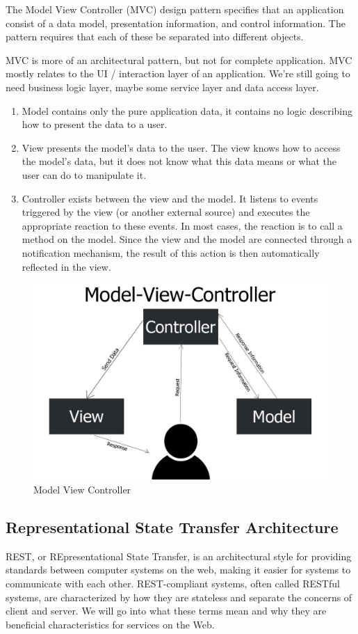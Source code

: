 The Model View Controller (MVC) design pattern specifies that an application consist of a data model, presentation information, and control information. The pattern requires that each of these be separated into different objects.

MVC is more of an architectural pattern, but not for complete application. MVC mostly relates to the UI / interaction layer of an application. We’re still going to need business logic layer, maybe some service layer and data access layer.
\begin{enumerate}
      \item Model contains only the pure application data, it contains no logic describing how to present the data to a user.
      \item View presents the model’s data to the user. The view knows how to access the model’s data, but it does not know what this data means or what the user can do to manipulate it.
      \item Controller exists between the view and the model. It listens to events triggered by the view (or another external source) and executes the appropriate reaction to these events. In most cases, the reaction is to call a method on the model. Since the view and the model are connected through a notification mechanism, the result of this action is then automatically reflected in the view.
\end{enumerate}

\begin{figure}[!ht]
      \center
      \includegraphics[scale=0.30]{assets/mvc.jpg}
      \caption{Model View Controller}
      \label{fig:mvc}
\end{figure}
\subsection{Representational State Transfer Architecture}
REST, or REpresentational State Transfer, is an architectural style for providing standards between computer systems on the web, making it easier for systems to communicate with each other. REST-compliant systems, often called RESTful systems, are characterized by how they are stateless and separate the concerns of client and server. We will go into what these terms mean and why they are beneficial characteristics for services on the Web.
